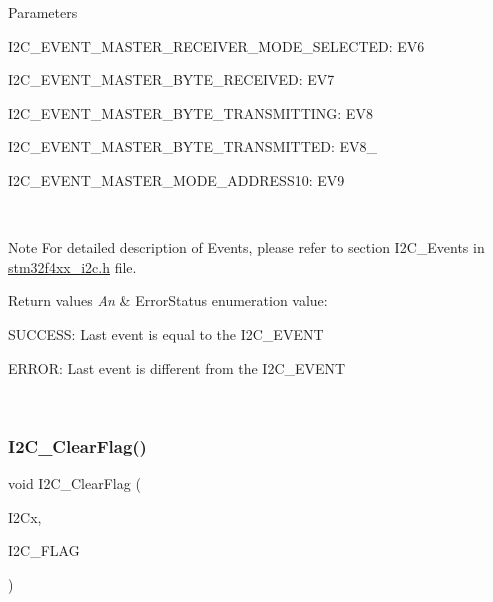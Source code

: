 \begin{DoxyParams}{Parameters}
\begin{DoxyItemize}
 \item I2\+C\+\_\+\+E\+V\+E\+N\+T\+\_\+\+M\+A\+S\+T\+E\+R\+\_\+\+R\+E\+C\+E\+I\+V\+E\+R\+\_\+\+M\+O\+D\+E\+\_\+\+S\+E\+L\+E\+C\+T\+ED\+: E\+V6 \item I2\+C\+\_\+\+E\+V\+E\+N\+T\+\_\+\+M\+A\+S\+T\+E\+R\+\_\+\+B\+Y\+T\+E\+\_\+\+R\+E\+C\+E\+I\+V\+ED\+: E\+V7 \item I2\+C\+\_\+\+E\+V\+E\+N\+T\+\_\+\+M\+A\+S\+T\+E\+R\+\_\+\+B\+Y\+T\+E\+\_\+\+T\+R\+A\+N\+S\+M\+I\+T\+T\+I\+NG\+: E\+V8 \item I2\+C\+\_\+\+E\+V\+E\+N\+T\+\_\+\+M\+A\+S\+T\+E\+R\+\_\+\+B\+Y\+T\+E\+\_\+\+T\+R\+A\+N\+S\+M\+I\+T\+T\+ED\+: E\+V8\+\_ \item I2\+C\+\_\+\+E\+V\+E\+N\+T\+\_\+\+M\+A\+S\+T\+E\+R\+\_\+\+M\+O\+D\+E\+\_\+\+A\+D\+D\+R\+E\+S\+S10\+: E\+V9\end{DoxyItemize}
\\
\hline
\end{DoxyParams}
\begin{DoxyNote}{Note}
For detailed description of Events, please refer to section I2\+C\+\_\+\+Events in \mbox{\hyperlink{stm32f4xx__i2c_8h}{stm32f4xx\+\_\+i2c.\+h}} file.
\end{DoxyNote}

\begin{DoxyRetVals}{Return values}
{\em An} & Error\+Status enumeration value\+:
\begin{DoxyItemize}
\item S\+U\+C\+C\+E\+SS\+: Last event is equal to the I2\+C\+\_\+\+E\+V\+E\+NT
\item E\+R\+R\+OR\+: Last event is different from the I2\+C\+\_\+\+E\+V\+E\+NT 
\end{DoxyItemize}\\
\hline
\end{DoxyRetVals}
\mbox{\label{group___i2_c_ga9d4f8fe9f7232696114b5578b1223963}} 
\subsubsection{\texorpdfstring{I2\+C\+\_\+\+Clear\+Flag()}{I2C\_ClearFlag()}}
{\footnotesize\ttfamily void I2\+C\+\_\+\+Clear\+Flag (\begin{DoxyParamCaption}\item[{I2\+C\+\_\+\+Type\+Def $\ast$}]{I2\+Cx,  }\item[{uint32\+\_\+t}]{I2\+C\+\_\+\+F\+L\+AG }\end{DoxyParamCaption})}



